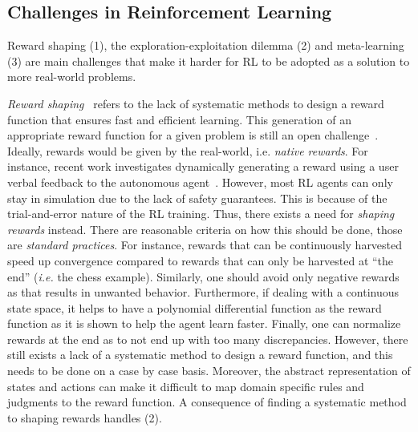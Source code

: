 \documentclass[a4paper,11pt]{article}
\theoremstyle{definition}
\begin{document}
\subsection{Challenges in Reinforcement Learning}
\label{sec:challenges}

Reward shaping (1), the exploration-exploitation dilemma (2) and
meta-learning (3) are main challenges
that make it harder for RL to be adopted as a solution to more real-world problems. 

\medskip 

\emph{Reward shaping}~\cite{laud2011} refers to the lack of systematic methods to design a reward
  function that ensures fast and efficient learning. This generation of an appropriate 
reward function for a given problem is still an open challenge~\cite{kober2013}.
Ideally, rewards would be given by the real-world, i.e. \textit{native rewards}. For instance, recent work investigates dynamically generating a reward 
using a user verbal feedback to the autonomous agent~\cite{gonzalez2010}. However, most RL agents 
can only stay in simulation due to the lack of safety guarantees. This is because of the trial-and-error nature of the RL training. 
Thus, there exists a need for \textit{shaping rewards} instead. There are reasonable criteria on how this should be done, those are \emph{standard practices}. For instance, 
rewards that can be continuously harvested speed up convergence
compared to rewards that can only be harvested at ``the end''
(\emph{i.e.} the chess example). Similarly, one should avoid only 
negative rewards as that results in unwanted behavior. Furthermore, if dealing with a continuous state space, it helps to have a polynomial differential function as the reward function 
as it is shown to help the agent learn faster. Finally, one can normalize rewards at the end as to not end up with too many discrepancies. 
However, there still exists a lack of a systematic method to design a
reward function, and this needs to be done on a case by case basis.
%
Moreover, the abstract representation of states and actions can make
it difficult to map domain specific rules and judgments to the reward
function. A consequence of finding a systematic method to shaping rewards handles (2).

\medskip
\end{document}
